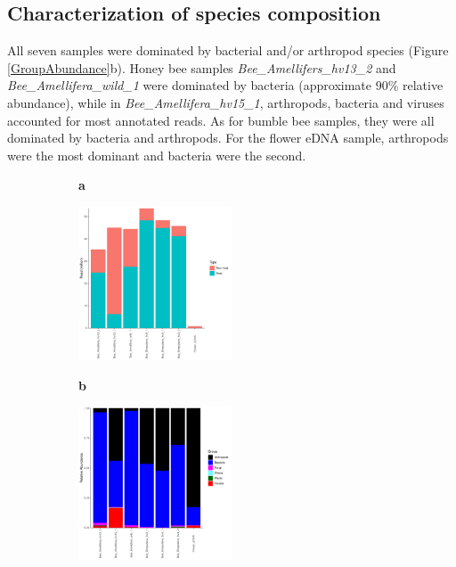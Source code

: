 \documentclass[11pt]{article}
\begin{document}
    \subsection{Characterization of species composition}
    All seven samples were dominated by bacterial and/or arthropod species (Figure \ref{GroupAbundance}b). 
    Honey bee samples \textit{Bee\_Amellifers\_hv13\_2} and \textit{Bee\_Amellifera\_wild\_1} were dominated by bacteria (approximate 90\% relative abundance), while in \textit{Bee\_Amellifera\_hv15\_1}, arthropods, bacteria and viruses accounted for most annotated reads. 
    As for bumble bee samples, they were all dominated by bacteria and arthropods. 
    For the flower eDNA sample, arthropods were the most dominant and bacteria were the second.

      \begin{figure}[H]
        \centering
        \begin{subfigure}
          \centering
          \textbf{a}
        \end{subfigure}
        \newline
        \begin{subfigure}
          \centering
          \includegraphics[width=0.5\textwidth]{../Figures/NonHostRatio.pdf}
        \end{subfigure}
        \vfill
        \newline
        \begin{subfigure}
          \centering
          \textbf{b}
        \end{subfigure}
        \newline
        \begin{subfigure}
          \centering
          \includegraphics[width=0.5\textwidth]{../Figures/1_species_RelAbundance_GroupAbundance.pdf}

\end{subfigure}
\end{figure}
\end{document}
